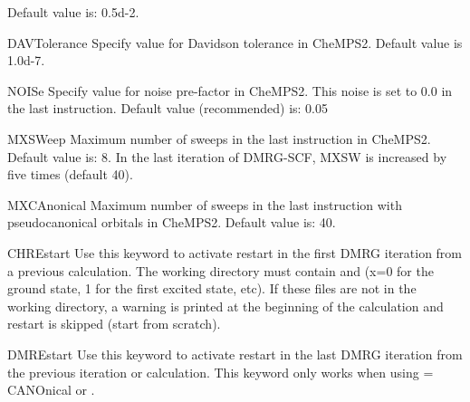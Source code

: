 \begin{keywordlist}
Default value is: 0.5d-2.
\item[DAVTolerance]
Specify value for Davidson tolerance in CheMPS2. 
Default value is 1.0d-7.
\item[NOISe]
Specify value for noise pre-factor in CheMPS2.
This noise is set to 0.0 in the last instruction. 
Default value (recommended) is: 0.05
\item[MXSWeep]
Maximum number of sweeps in the last instruction in CheMPS2. 
Default value is: 8.
In the last iteration of DMRG-SCF, MXSW is increased by five times (default 40).
\item[MXCAnonical]
Maximum number of sweeps in the last instruction with pseudocanonical orbitals in CheMPS2.
Default value is: 40.
\item[CHREstart]
Use this keyword to activate restart in the first DMRG iteration from a previous calculation. 
The working directory must contain  and  (x=0 for the ground state, 
1 for the first excited state, etc). 
If these files are not in the working directory, a warning is printed at the beginning of 
the calculation and restart is skipped (start from scratch).
\item[DMREstart]
Use this keyword to activate restart in the last DMRG iteration from the previous iteration or calculation.
This keyword only works when using  = CANOnical or .


\end{keywordlist}
